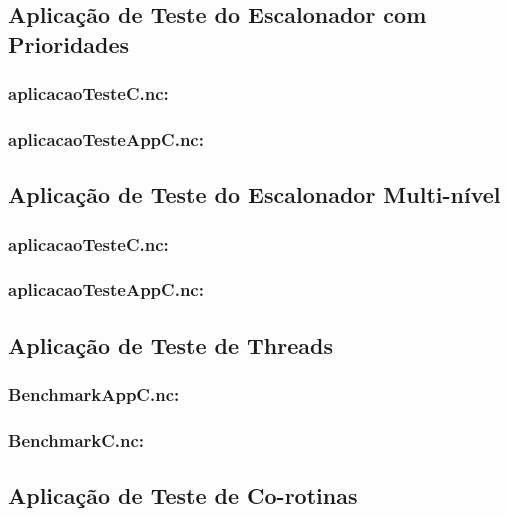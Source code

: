 \documentclass[a4paper, 10pt]{article}
\begin{document}
\subsection{Aplicação de Teste do Escalonador com Prioridades}\label{a:appTeste}
    \subsubsection{aplicacaoTesteC.nc:}
    

    \subsubsection{aplicacaoTesteAppC.nc:}
    

\subsection{Aplicação de Teste do Escalonador Multi-nível}\label{a:appTesteMulti}
    \subsubsection{aplicacaoTesteC.nc:}
    

    \subsubsection{aplicacaoTesteAppC.nc:}
    

\subsection{Aplicação de Teste de Threads}\label{a:appTesteThread}
    \subsubsection{BenchmarkAppC.nc:}
    

    \subsubsection{BenchmarkC.nc:}
    

\subsection{Aplicação de Teste de Co-rotinas}\label{a:appTesteCoro}
\end{document}
